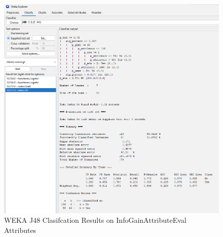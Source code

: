 \documentclass[12pt]{article}
\begin{document}
\begin{figure}[h!]
    \includegraphics[scale=0.4]{./images/InfoGainAttributeEval/J48-Summary.png}
\centering
    \caption{WEKA J48 Clasifcation Results on InfoGainAttributeEval Attributes}
\end{figure}

\newpage 
\end{document}
